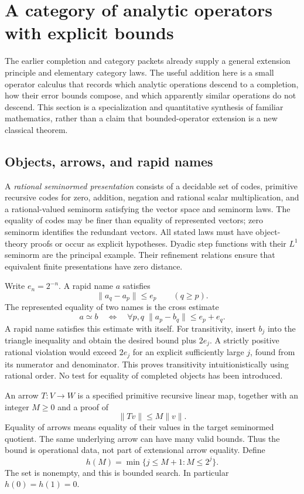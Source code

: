\section{A category of analytic operators with explicit bounds}
\label{ct:operators}

The earlier completion and category packets already supply a general
extension principle and elementary category laws. The useful addition here
is a small operator calculus that records which analytic operations descend
to a completion, how their error bounds compose, and which apparently
similar operations do not descend. This section is a specialization and
quantitative synthesis of familiar mathematics, rather than a claim that
bounded-operator extension is a new classical theorem.

\subsection{Objects, arrows, and rapid names}

A \emph{rational seminormed presentation} consists of a decidable set of
codes, primitive recursive codes for zero, addition, negation and rational
scalar multiplication, and a rational-valued seminorm satisfying the vector
space and seminorm laws. The equality of codes may be finer than equality
of represented vectors; zero seminorm identifies the redundant vectors.
All stated laws must have object-theory proofs or occur as explicit
hypotheses. Dyadic step functions with their $L^1$ seminorm are the principal
example. Their refinement relations ensure that equivalent finite
presentations have zero distance.

Write $e_n=2^{-n}$. A rapid name $a$ satisfies
\[
   \|a_q-a_p\|\leq e_p\qquad(q\geq p).
\]
The represented equality of two names is the cross estimate
\[
 a\simeq b\quad\Longleftrightarrow\quad
 \forall p,q\;\|a_p-b_q\|\leq e_p+e_q.
\]
A rapid name satisfies this estimate with itself. For transitivity, insert
$b_j$ into the triangle inequality and obtain the desired bound plus
$2e_j$. A strictly positive rational violation would exceed $2e_j$ for an
explicit sufficiently large $j$, found from its numerator and denominator.
This proves transitivity intuitionistically using rational order. No test
for equality of completed objects has been introduced.

An arrow $T:V\to W$ is a specified primitive recursive linear map, together
with an integer $M\geq0$ and a proof of
\[
                    \|Tv\|\leq M\|v\|.
\]
Equality of arrows means equality of their values in the target
seminormed quotient. The same underlying arrow can have many valid bounds.
Thus the bound is operational data, not part of extensional arrow equality.
Define
\[
 h(M)=\min\{j\leq M+1:M\leq2^j\}.
\]
The set is nonempty, and this is bounded search. In particular $h(0)=h(1)=0$.

